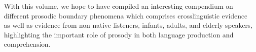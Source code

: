 \begin{refsection}
\begin{sloppypar}
With this volume, we hope to have compiled an interesting compendium on different prosodic boundary phenomena which comprises crosslinguistic evidence as well as evidence from non-native listeners, infants, adults, and elderly speakers, highlighting the important role of prosody in both language production and comprehension. 
\end{sloppypar}

{\sloppy\printbibliography[heading=subbibliography]}
\end{refsection}
